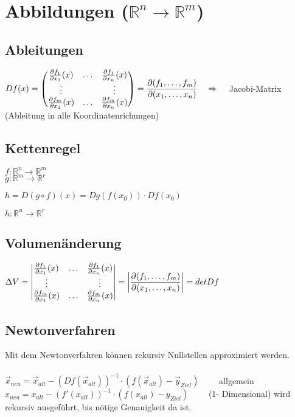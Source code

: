 \section{Abbildungen ($\mathbb{R}^n \rightarrow \mathbb{R}^m$)
}
\subsection{Ableitungen}
$Df(x) = \begin{pmatrix}
    	\frac{\partial f_1}{\partial x_1}(x) & \ldots & \frac{\partial f_1}{\partial x_n}(x)\\
    	\vdots && \vdots\\
    	\frac{\partial f_m}{\partial x_1}(x) & \ldots & \frac{\partial f_m}{\partial x_n}(x)
	\end{pmatrix}=\dfrac{\partial(f_1,\ldots,f_m)}{\partial(x_1,\ldots,x_n)}
	\quad \Rightarrow \quad$ Jacobi-Matrix (Ableitung in alle Koordinatenrichungen)
\subsection{Kettenregel}
\begin{minipage}{3cm}
	$f: \mathbb{R}^n \rightarrow \mathbb{R}^m$\\
	$g: \mathbb{R}^m \rightarrow \mathbb{R}^r$
\end{minipage}
\begin{minipage}{7cm}
	$\boxed{h=D(g\circ f)(x)=Dg(f(x_0))\cdot Df(x_0)}$
\end{minipage}
\begin{minipage}{4cm}
	$h: \mathbb{R}^n \rightarrow \mathbb{R}^r$
\end{minipage}

\subsection{Volumenänderung}
$\Delta V = \begin{vmatrix}
    	\frac{\partial f_1}{\partial x_1}(x) & \ldots & \frac{\partial f_1}{\partial x_n}(x)\\
    	\vdots && \vdots\\
    	\frac{\partial f_m}{\partial x_1}(x) & \ldots & \frac{\partial f_m}{\partial x_n}(x)
		\end{vmatrix}=\left|\dfrac{\partial(f_1,\ldots,f_m)}
		{\partial(x_1,\ldots,x_n)}\right|= det Df$

\subsection{Newtonverfahren}
Mit dem Newtonverfahren können rekursiv Nullstellen approximiert werden.\\\\
$\boxed{\vec{x}_{neu}=\vec{x}_{alt}-(Df(\vec{x}_{alt}))^{-1}\cdot
(f(\vec{x}_{alt})-\vec{y}_{Ziel})}\qquad$ allgemein\\
$\boxed{x_{neu}=x_{alt}-(f'(x_{alt}))^{-1}\cdot
(f(x_{alt})-y_{Ziel})}\qquad$ (1- Dimensional) wird
rekursiv ausgeführt, bis nötige Genauigkeit da ist.
